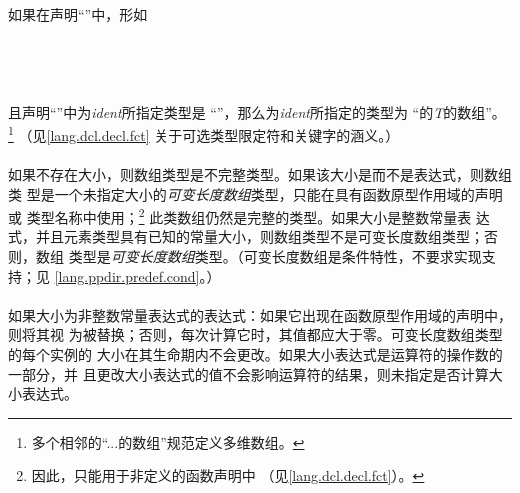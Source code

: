 {\paragraph{}
如果在声明``''中，形如                                        \\
\mbox{\hspace{4em}\tm{D[}  \tm{]}}                                    \\
\mbox{\hspace{4em}\tm{D[static}  \tm{]}}                                              \\
\mbox{\hspace{4em}\tm{D[}  
   \tm{]}}                                          \\
\mbox{\hspace{4em}\tm{D[}  \tm{*]}}         \\
且声明``''中为\textit{ident}所指定类型是
``''，那么为\textit{ident}所指定的类型为
``的\textit{T}的数组''。
\footnote{多个相邻的``...的数组''规范定义多维数组。} （见\ref{lang.dcl.decl.fct}
关于可选类型限定符和关键字的涵义。）

\paragraph{}
如果不存在大小，则数组类型是不完整类型。如果该大小是\tm{*}而不是表达式，则数组类
型是一个未指定大小的\textit{可变长度数组}类型，只能在具有函数原型作用域的声明或
类型名称中使用；\footnote{因此，\tm{*}只能用于非定义的函数声明中
（见\ref{lang.dcl.decl.fct}）。} 此类数组仍然是完整的类型。如果大小是整数常量表
达式，并且元素类型具有已知的常量大小，则数组类型不是可变长度数组类型；否则，数组
类型是\textit{可变长度数组}类型。（可变长度数组是条件特性，不要求实现支持；见
\ref{lang.ppdir.predef.cond}。）

\paragraph{}
如果大小为非整数常量表达式的表达式：如果它出现在函数原型作用域的声明中，则将其视
为被\tm{*}替换；否则，每次计算它时，其值都应大于零。可变长度数组类型的每个实例的
大小在其生命期内不会更改。如果大小表达式是运算符的操作数的一部分，并
且更改大小表达式的值不会影响运算符的结果，则未指定是否计算大小表达式。

}
